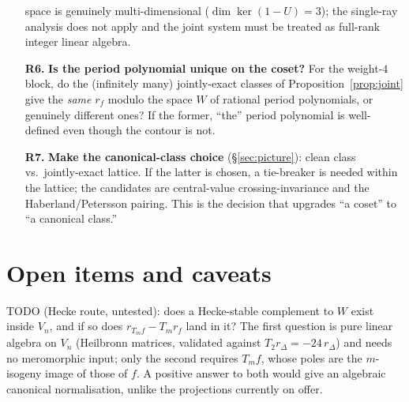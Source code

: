 \documentclass[11pt]{article}
\theoremstyle{definition}
\theoremstyle{remark}
\begin{document}
\begin{enumerate}
space is genuinely multi-dimensional ($\dim\ker(1-U)=3$); the single-ray analysis does
not apply and the joint system must be treated as full-rank integer linear algebra.
\item[\textbf{R6.}] \textbf{Is the period polynomial unique on the coset?} For the
weight-$4$ block, do the (infinitely many) jointly-exact classes of
Proposition~\ref{prop:joint} give the \emph{same} $r_f$ modulo the space $W$ of rational
period polynomials, or genuinely different ones? If the former, ``the'' period polynomial
is well-defined even though the contour is not.
\item[\textbf{R7.}] \textbf{Make the canonical-class choice} (\S\ref{sec:picture}):
clean class vs.\ jointly-exact lattice. If the latter is chosen, a tie-breaker is needed
within the lattice; the candidates are central-value crossing-invariance and the
Haberland/Petersson pairing. This is the decision that upgrades ``a coset'' to ``a
canonical class.''
\end{enumerate}

\section{Open items and caveats}\label{sec:open}

TODO (Hecke route, untested): does a Hecke-stable complement to $W$ exist inside $V_n$, and if so does $r_{T_mf}-T_mr_f$ land in it? The first question is pure linear algebra on $V_n$ (Heilbronn matrices, validated against $T_2r_\Delta=-24\,r_\Delta$) and needs no meromorphic input; only the second requires $T_mf$, whose poles are the $m$-isogeny image of those of $f$. A positive answer to both would give an algebraic canonical normalisation, unlike the projections currently on offer.
\end{document}

